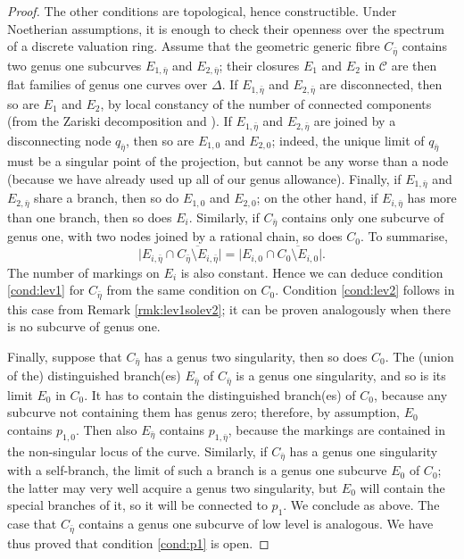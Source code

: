\documentclass{compositio}
\newcommand{\dvr}{\Delta}
\theoremstyle{plain}
\theoremstyle{definition}
\theoremstyle{remark}
\begin{document}
\begin{proof}
 The other conditions are topological, hence constructible. Under Noetherian assumptions, it is enough to check their openness over the spectrum of a discrete valuation ring. Assume that the geometric generic fibre $C_{\bar\eta}$ contains two genus one subcurves $E_{1,\bar\eta}$ and $E_{2,\bar\eta}$; their closures $E_1$ and $E_2$ in $\mathcal C$ are then flat families of genus one curves over $\dvr$. If $E_{1,\bar\eta}$ and $E_{2,\bar\eta}$ are disconnected, then so are $E_1$ and $E_2$, by local constancy of the number of connected components (from the Zariski decomposition and \cite[\href{https://stacks.math.columbia.edu/tag/0E0D}{Tag 0E0D}]{stacks-project}). If $E_{1,\bar\eta}$ and $E_{2,\bar\eta}$ are joined by a disconnecting node $q_{\bar\eta}$, then so are $E_{1,0}$ and $E_{2,0}$; indeed, the unique limit of $q_{\bar\eta}$ must be a singular point of the projection, but cannot be any worse than a node (because we have already used up all of our genus allowance). Finally, if $E_{1,\bar\eta}$ and $E_{2,\bar\eta}$ share a branch, then so do $E_{1,0}$ and $E_{2,0}$; on the other hand, if $E_{i,\bar\eta}$ has more than one branch, then so does $E_i$. Similarly, if $C_{\bar\eta}$ contains only one subcurve of genus one, with two nodes joined by a rational chain, so does $C_0$. To summarise,
 \[\lvert E_{i,\bar\eta}\cap\overline{C_{\bar\eta}\setminus E_{i,\bar\eta}}\rvert=\lvert E_{i,0}\cap\overline{C_{0}\setminus E_{i,0}}\rvert.\]
 The number of markings on $E_i$ is also constant. Hence we can deduce condition \eqref{cond:lev1} for $C_{\bar\eta}$ from the same condition on $C_0$. Condition \eqref{cond:lev2} follows in this case from Remark \ref{rmk:lev1solev2}; it can be proven analogously when there is no subcurve of genus one.
 
 Finally, suppose that $C_{\bar\eta}$ has a genus two singularity, then so does $C_0$. The (union of the) distinguished branch(es) $E_{\bar\eta}$ of $C_{\bar\eta}$ is a genus one singularity, and so is its limit $E_0$ in $C_0$. It has to contain the distinguished branch(es) of $C_0$, because any subcurve not containing them has genus zero; therefore, by assumption, $E_0$ contains $p_{1,0}$. Then also $E_{\bar\eta}$ contains $p_{1,\bar\eta}$, because the markings are contained in the non-singular locus of the curve. Similarly, if $C_{\bar\eta}$ has a genus one singularity with a self-branch, the limit of such a branch is a genus one subcurve $E_0$ of $C_0$; the latter may very well acquire a genus two singularity, but $E_0$ will contain the special branches of it, so it will be connected to $p_1$. We conclude as above. The case that $C_{\bar\eta}$ contains a genus one subcurve of low level is analogous. We have thus proved that condition \eqref{cond:p1} is open.
\end{proof}
\end{document}
